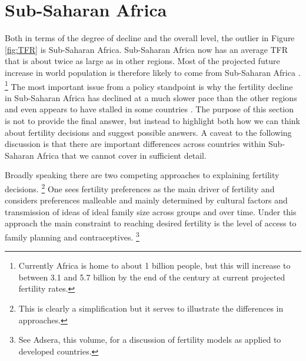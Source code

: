 \documentclass[letterpaper,12pt]{article}
\begin{document}
\section{Sub-Saharan Africa}\label{sub-saharan-africa}

Both in terms of the degree of decline and the overall level, the
outlier in Figure \ref{fig:TFR} is Sub-Saharan Africa. 
Sub-Saharan Africa now has an average TFR that is about twice as large
as in other regions. 
Most of the projected future increase in world population is therefore
likely to come from Sub-Saharan Africa \citep{Gerland2014}.%
\footnote{
Currently Africa is home to about 1 billion people, but this will
increase to between 3.1 and 5.7 billion by the end of the century at
current projected fertility rates.
} 
The most important issue from a policy standpoint is why the fertility
decline in Sub-Saharan Africa has declined at a much slower pace than
the other regions and even appears to have stalled in some countries
\citep{Ainsworth1996a,Singh2017}. 
The purpose of this section is not to provide the final answer, but
instead to highlight both how we can think about fertility decisions and
suggest possible answers. 
A caveat to the following discussion is that there are important
differences across countries within Sub-Saharan Africa that we cannot
cover in sufficient detail.

Broadly speaking there are two competing approaches to explaining
fertility decisions.%
\footnote{
This is clearly a simplification but it serves to illustrate the
differences in approaches.
} 
One sees fertility preferences as the main driver of fertility and
considers preferences malleable and mainly determined by cultural
factors and transmission of ideas of ideal family size across groups and
over time. 
Under this approach the main constraint to reaching desired fertility is
the level of access to family planning and contraceptives.%
\footnote{
See Adsera, this volume, for a discussion of fertility models as applied
to developed countries.
}
\end{document}
